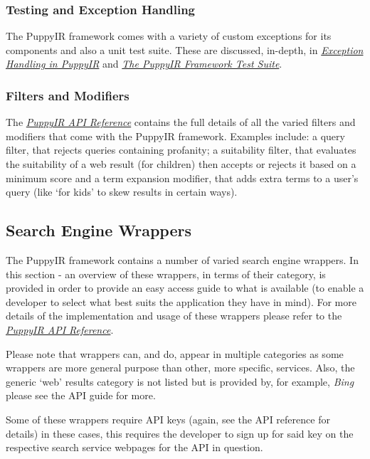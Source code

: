 \documentclass[letterpaper,10pt,english]{sphinxmanual}
\begin{document}
\subsubsection{Testing and Exception Handling}
\label{overview:testing-and-exception-handling}
The PuppyIR framework comes with a variety of custom exceptions for its components and also a unit test suite. These are discussed, in-depth, in {\hyperref[exceptions:exceptionsinpuppyir]{\emph{Exception Handling in PuppyIR}}} and {\hyperref[test-suite:the-puppyir-framework-test-suite]{\emph{The PuppyIR Framework Test Suite}}}.


\subsubsection{Filters and Modifiers}
\label{overview:filters-and-modifiers}
The {\hyperref[api3.0:api]{\emph{PuppyIR API Reference}}} contains the full details of all the varied filters and modifiers that come with the PuppyIR framework. Examples include: a query filter, that rejects queries containing profanity; a suitability filter, that evaluates the suitability of a web result (for children) then accepts or rejects it based on a minimum score and a term expansion modifier, that adds extra terms to a user's query (like `for kids' to skew results in certain ways).


\subsection{Search Engine Wrappers}
\label{overview:search-engine-wrappers}
The PuppyIR framework contains a number of varied search engine wrappers. In this section - an overview of these wrappers, in terms of their category, is provided in order to provide an easy access guide to what is available (to enable a developer to select what best suits the application they have in mind). For more details of the implementation and usage of these wrappers please refer to the {\hyperref[api3.0:api]{\emph{PuppyIR API Reference}}}.

Please note that wrappers can, and do, appear in multiple categories as some wrappers are more general purpose than other, more specific, services. Also, the generic `web' results category is not listed but is provided by, for example, \emph{Bing} please see the API guide for more.

Some of these wrappers require API keys (again, see the API reference for details) in these cases, this requires the developer to sign up for said key on the respective search service webpages for the API in question.
\end{document}
